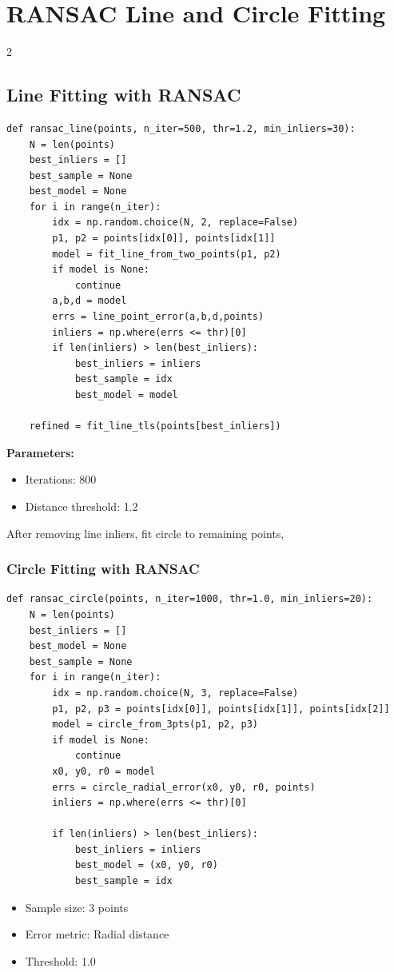 \documentclass[9pt]{article}
\begin{document}
\section{RANSAC Line and Circle Fitting}
\begin{multicols}{2}
\subsection{Line Fitting with RANSAC}
\begin{lstlisting}[caption={RANSAC line fitting}]
def ransac_line(points, n_iter=500, thr=1.2, min_inliers=30):
    N = len(points)
    best_inliers = []
    best_sample = None
    best_model = None
    for i in range(n_iter):
        idx = np.random.choice(N, 2, replace=False)
        p1, p2 = points[idx[0]], points[idx[1]]
        model = fit_line_from_two_points(p1, p2)
        if model is None:
            continue
        a,b,d = model
        errs = line_point_error(a,b,d,points)
        inliers = np.where(errs <= thr)[0]
        if len(inliers) > len(best_inliers):
            best_inliers = inliers
            best_sample = idx
            best_model = model
            
    refined = fit_line_tls(points[best_inliers])
\end{lstlisting}

\textbf{Parameters:}
\begin{itemize}
    \item Iterations: 800
    \item Distance threshold: 1.2
\end{itemize}
After removing line inliers, fit circle to remaining points,
\newcolumn
\subsubsection{Circle Fitting with RANSAC}

\begin{lstlisting}[caption={RANSAC circle fitting}]
def ransac_circle(points, n_iter=1000, thr=1.0, min_inliers=20):
    N = len(points)
    best_inliers = []
    best_model = None
    best_sample = None
    for i in range(n_iter):
        idx = np.random.choice(N, 3, replace=False)
        p1, p2, p3 = points[idx[0]], points[idx[1]], points[idx[2]]
        model = circle_from_3pts(p1, p2, p3)
        if model is None:
            continue
        x0, y0, r0 = model
        errs = circle_radial_error(x0, y0, r0, points)
        inliers = np.where(errs <= thr)[0]

        if len(inliers) > len(best_inliers):
            best_inliers = inliers
            best_model = (x0, y0, r0)
            best_sample = idx
\end{lstlisting}

\begin{itemize}
    \item Sample size: 3 points
    \item Error metric: Radial distance
    \item Threshold: 1.0
\end{itemize}
\end{multicols}
\end{document}

